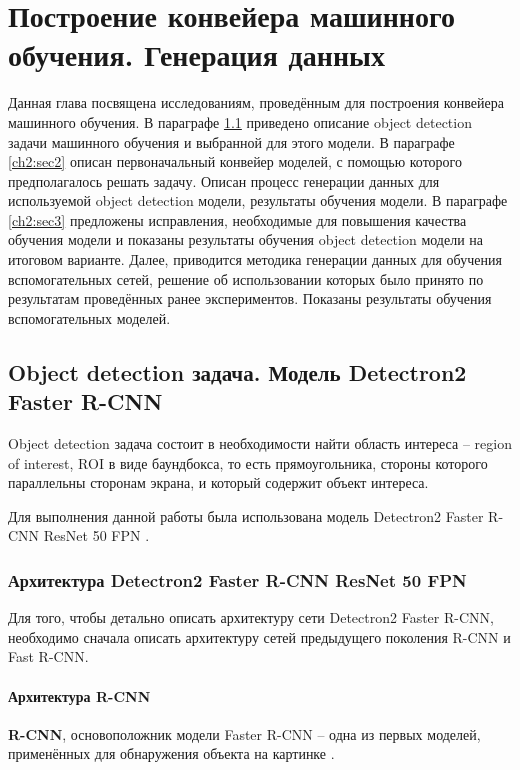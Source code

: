 \chapter{Построение конвейера машинного обучения. Генерация данных} \label{ch2}

Данная глава посвящена исследованиям, проведённым для построения конвейера машинного обучения. В параграфе \ref{ch2:sec1} приведено описание object detection задачи машинного обучения и выбранной для этого модели. В параграфе \ref{ch2:sec2} описан первоначальный конвейер моделей, с помощью которого предполагалось решать задачу. Описан процесс генерации данных для используемой object detection модели, результаты обучения модели. В параграфе \ref{ch2:sec3} предложены исправления, необходимые для повышения качества обучения модели и  показаны результаты обучения object detection модели на итоговом варианте. Далее, приводится методика генерации данных для обучения вспомогательных сетей, решение об использовании которых было принято по результатам проведённых ранее экспериментов. Показаны результаты обучения вспомогательных моделей.

\section{Object detection задача. Модель Detectron2 Faster R-CNN} \label{ch2:sec1}

Object detection задача состоит в необходимости найти область интереса -- region of interest, ROI в виде баундбокса, то есть прямоугольника, стороны которого параллельны сторонам экрана, и который содержит объект интереса.

Для выполнения данной работы была использована модель Detectron2 Faster R-CNN ResNet 50 FPN \cite{detectron}.

\subsection{Архитектура Detectron2 Faster R-CNN ResNet 50 FPN}

Для того, чтобы детально описать архитектуру сети Detectron2 Faster R-CNN, необходимо сначала описать архитектуру сетей предыдущего поколения R-CNN и Fast R-CNN.

\subsubsection{Архитектура R-CNN}

\textbf{R-CNN}, основоположник модели Faster R-CNN -- одна из первых моделей, применённых для обнаружения объекта на картинке \cite{rcnn}.

